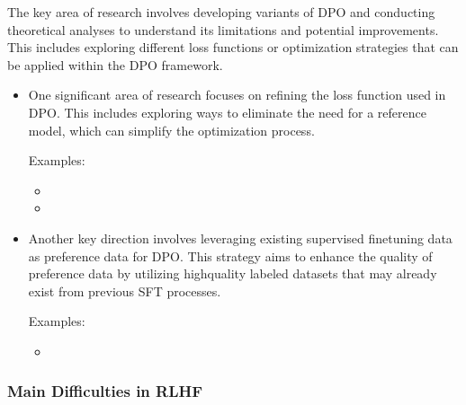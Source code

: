 \documentclass[letterpaper,11pt,english]{sphinxmanual}
\begin{document}
\sphinxAtStartPar
{}

\sphinxAtStartPar
The key area of research involves developing variants of DPO and
conducting theoretical analyses to understand its limitations and
potential improvements. This includes exploring different loss functions
or optimization strategies that can be applied within the DPO framework.
\begin{itemize}
\item {} 
\sphinxAtStartPar
One significant area of research focuses on refining the loss function
used in DPO. This includes exploring ways to eliminate the need for a
reference model, which can simplify the optimization process.

\sphinxAtStartPar
Examples:
\begin{itemize}
\item {} 
\sphinxAtStartPar
{}

\item {} 
\sphinxAtStartPar
{}

\end{itemize}

\item {} 
\sphinxAtStartPar
Another key direction involves leveraging existing supervised
fine\sphinxhyphen{}tuning data as preference data for DPO. This strategy aims to
enhance the quality of preference data by utilizing high\sphinxhyphen{}quality
labeled datasets that may already exist from previous SFT processes.

\sphinxAtStartPar
Examples:
\begin{itemize}
\item {} 
\sphinxAtStartPar
{}

\end{itemize}

\end{itemize}


\subsubsection{Main Difficulties in RLHF}
\label{\detokenize{finetuning:main-difficulties-in-rlhf}}
\sphinxAtStartPar
{}
\end{document}
